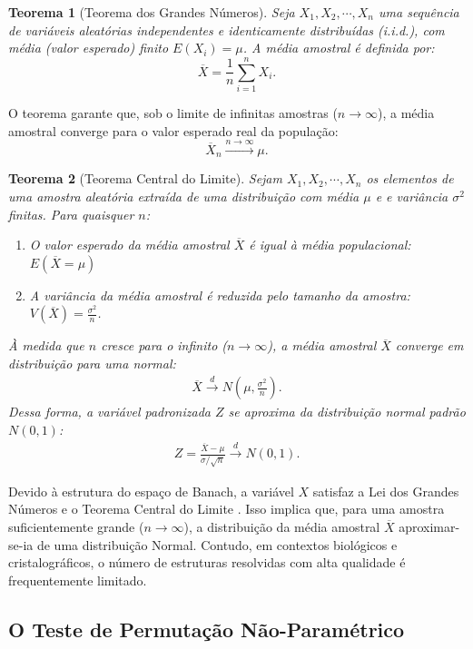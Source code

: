 \documentclass[12pt, a4paper]{article}
\theoremstyle{plain}
\newtheorem{theorem}{Teorema}[section]
\theoremstyle{definition}
\theoremstyle{remark}
\newcommand{\ident}{\hspace{2em}}
\begin{document}
\begin{theorem}[Teorema dos Grandes Números]
    Seja $X_1, X_2, \cdots, X_n$ uma sequência de variáveis aleatórias independentes e identicamente distribuídas (i.i.d.), com média (valor esperado) finito $E(X_i) = \mu$. A média amostral é definida por: 
    \[
        \overline{X} = \frac{1}{n} \sum_{i=1}^{n}X_i.
    \]
\end{theorem}
O teorema garante que, sob o limite de infinitas amostras ($n \rightarrow \infty $), a média amostral converge para o valor esperado real da população:
\[
\overline{X}_n\xrightarrow{n \rightarrow \infty} \mu.
\]

\begin{theorem}[Teorema Central do Limite]
    Sejam $X_1, X_2, \cdots, X_n$  os elementos de uma amostra aleatória extraída de uma distribuição com média $\mu$ e e variância $\sigma^2$ finitas. Para quaisquer $n$:
    \begin{enumerate}
        \item O valor esperado da média amostral $\overline{X}$ é igual à média populacional: $E(\overline{X} = \mu)$
        \item A variância da média amostral é reduzida pelo tamanho da amostra: $V(\overline{X})= \frac{\sigma^2}{n}$.
    \end{enumerate}
    À medida que $n$ cresce para o infinito ($n \rightarrow \infty$), a média amostral $\overline{X}$ converge em distribuição para uma normal:
    \begin{align*}
        \overline{X} \xrightarrow{d} N\left(\mu, \frac{\sigma^2}{n}\right).
    \end{align*}
    Dessa forma, a variável padronizada $Z$ se aproxima da distribuição normal padrão $N(0, 1)$:
    \begin{align*}
        Z = \frac{\overline{X}-\mu}{\sigma/\sqrt{n}} \xrightarrow{d} N(0,1).
    \end{align*}
\end{theorem}

\ident Devido à estrutura do espaço de Banach, a variável $X$ satisfaz a Lei dos Grandes Números e o Teorema Central do Limite \cite{Bubenik2015} \cite{devore2012}. Isso implica que, para uma amostra suficientemente grande ($n \to \infty$), a distribuição da média amostral $\overline{X}$ aproximar-se-ia de uma distribuição Normal. Contudo, em contextos biológicos e cristalográficos, o número de estruturas resolvidas com alta qualidade é frequentemente limitado. 

\subsection{O Teste de Permutação Não-Paramétrico}
\end{document}
